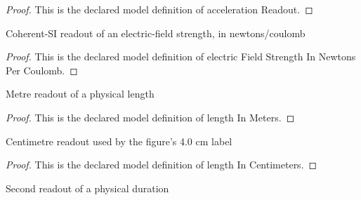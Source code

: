 \begin{proof}
  This is the declared model definition of acceleration Readout.
\end{proof}
\begin{definition}
  \label{def:physics:phyx-mini-0836:phyxminiproblems-problemphyxmini0836-electricfieldstrengthinnewtonspercoulomb}
  Coherent-SI readout of an electric-field strength, in newtons/coulomb
\end{definition}
\begin{proof}
  This is the declared model definition of electric Field Strength In Newtons Per Coulomb.
\end{proof}
\begin{definition}
  \label{def:physics:phyx-mini-0836:phyxminiproblems-problemphyxmini0836-lengthinmeters}
  Metre readout of a physical length
\end{definition}
\begin{proof}
  This is the declared model definition of length In Meters.
\end{proof}
\begin{definition}
  \label{def:physics:phyx-mini-0836:phyxminiproblems-problemphyxmini0836-lengthincentimeters}
  Centimetre readout used by the figure's 4.0 cm label
\end{definition}
\begin{proof}
  This is the declared model definition of length In Centimeters.
\end{proof}
\begin{definition}
  \label{def:physics:phyx-mini-0836:phyxminiproblems-problemphyxmini0836-timeinseconds}
  Second readout of a physical duration
\end{definition}

